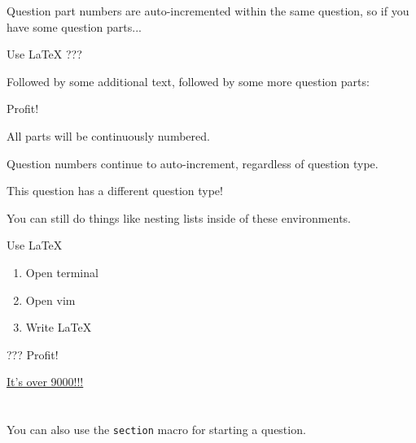 \documentclass[11pt]{homework}
\begin{document}
\question
Question part numbers are auto-incremented within the same question, so if you have some question parts...

\begin{alphaparts}
  \questionpart
  Use \LaTeX
  \questionpart ???
\end{alphaparts}

Followed by some additional text, followed by some more question parts:

\begin{alphaparts}
  \questionpart Profit!
\end{alphaparts}

All parts will be continuously numbered.

\question
Question numbers continue to auto-increment, regardless of question type.

\lipsum[4]

\renewcommand{\questiontype}{Task}
\question
This question has a different question type!

\lipsum[5]

\renewcommand{\questiontype}{Question}

\question
You can still do things like nesting lists inside of these environments.
\begin{alphaparts}
  \questionpart Use \LaTeX
  \begin{enumerate}
    \item Open terminal
    \item Open vim
    \item Write LaTeX
  \end{enumerate}
  \questionpart ???
  \questionpart Profit!
\end{alphaparts}

\lipsum[9]

\setcounter{questionCounter}{9000}
\question
\href{https://www.youtube.com/watch?v=SiMHTK15Pik}{It's over 9000!!!}

\lipsum[6]


\section{}
You can also use the \texttt{section} macro for starting a question.
\end{document}
